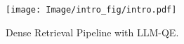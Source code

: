 \begin{figure}[t]
  \centering
  \texttt{[image: Image/intro\_fig/intro.pdf]}
  \caption{Dense Retrieval Pipeline with LLM-QE.}
  \label{fig:pipline}
\end{figure}